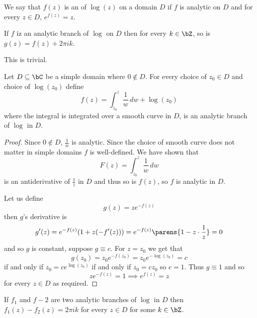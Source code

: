 \documentclass[10pt]{article}
\begin{document}
\begin{defn*}

    We say that $f(z)$ is an  of $\log(z)$ on a domain $D$ if $f$ is analytic on $D$ and for every $z\in D$, $e^{f(z)}=z$.

\end{defn*}

\begin{lemm*}

    If $f$ iz an analytic branch of $\log$ on $D$ then for every $k\in\bZ$, so is $g(z)=f(z)+2\pi ik$.

\end{lemm*}

This is trivial.

\begin{thrm*}

    Let $D\subseteq\bC$ be a simple domain where $0\notin D$.
    For every choice of $z_0\in D$ and choice of $\log(z_0)$ define
    \[ f(z) = \int_{z_0}^z\frac1w\,dw + \log(z_0) \]
    where the integral is integrated over a smooth curve in $D$, is an analytic branch of $\log$ in $D$.

\end{thrm*}

\begin{proof}

    Since $0\notin D$, $\frac1w$ is analytic.
    Since the choice of smooth curve does not matter in simple domains $f$ is well-defined.
    We have shown that
    \[ F(z) = \int_{z_0}^z\frac1w\,dw \]
    is an antiderivative of $\frac1z$ in $D$ and thus so is $f(z)$, so $f$ is analytic in $D$.

    Let us define
    \[ g(z) = ze^{-f(z)} \]
    then $g$'s derivative is
    \[ g'(z) = e^{-f(z)}(1+z(-f'(z))) = e^{-f(z)}\parens{1-z\cdot\frac1z} = 0 \]
    and so $g$ is constant, suppose $g\equiv c$.
    For $z=z_0$ we get that
    \[ g(z_0) = z_0e^{-f(z_0)} = z_0e^{-\log(z_0)} = c \]
    if and only if $z_0=ce^{\log(z_0)}$ if and only if $z_0=cz_0$ so $c=1$.
    Thus $g\equiv 1$ and so
    \[ ze^{-f(z)} = 1 \implies e^{f(z)} = z \]
    for every $z\in D$ as required.

\end{proof}

\begin{lemm*}

    If $f_1$ and $f-2$ are two analytic branches of $\log$ in $D$ then $f_1(z)-f_2(z)=2\pi ik$ for every $z\in D$ for some $k\in\bZ$.

\end{lemm*}
\end{document}

